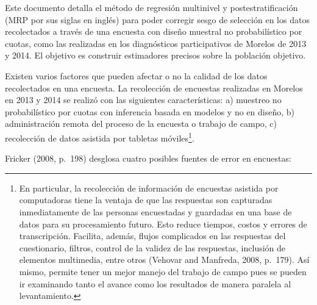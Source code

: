 \documentclass[]{article}
\let\rmarkdownfootnote\footnote%
\def\footnote{\protect\rmarkdownfootnote}
\begin{document}
Este documento detalla el método de regresión multinivel y
postestratificación (MRP por sus siglas en inglés) para poder corregir
sesgo de selección en los datos recolectados a través de una encuesta
con diseño muestral no probabilístico por cuotas, como las realizadas en
los diagnósticos participativos de Morelos de 2013 y 2014. El objetivo
es construir estimadores precisos sobre la población objetivo.

Existen varios factores que pueden afectar o no la calidad de los datos
recolectados en una encuesta. La recolección de encuestas realizadas en
Morelos en 2013 y 2014 se realizó con las siguientes características: a)
muestreo no probabilístico por cuotas con inferencia basada en modelos y
no en diseño, b) administración remota del proceso de la encuesta o
trabajo de campo, c) recolección de datos asistida por tabletas
móviles\footnote{En particular, la recolección de información de
  encuestas asistida por computadoras tiene la ventaja de que las
  respuestas son capturadas inmediatamente de las personas encuestadas y
  guardadas en una base de datos para su procesamiento futuro. Esto
  reduce tiempos, costos y errores de transcripción. Facilita, además,
  flujos complicados en las respuestas del cuestionario, filtros,
  control de la validez de las respuestas, inclusión de elementos
  multimedia, entre otros (Vehovar and Manfreda, 2008, p.~179). Así
  mismo, permite tener un mejor manejo del trabajo de campo pues se
  pueden ir examinando tanto el avance como los resultados de manera
  paralela al levantamiento.}.

Fricker (2008, p.~198) desglosa cuatro posibles fuentes de error en
encuestas:
\end{document}
